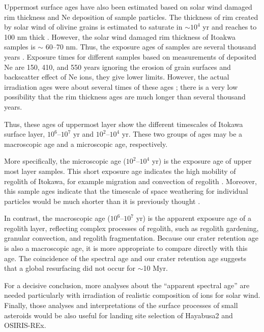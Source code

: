 \documentclass[3p,authoryear]{elsarticle}
\begin{document}
Uppermost surface ages have also been estimated based on solar wind damaged rim thickness and Ne deposition of sample particles. The thickness of rim created by solar wind of olivine grains is estimated to saturate in $\sim 10^4$ yr and reaches to 100 nm thick \citep{keller2016}. However, the solar wind damaged rim thickness of Itoakwa samples is $\sim$ 60--70 nm. Thus, the exposure ages of samples are several thousand years \citep{berger2015}. Exposure times for different samples based on measurements of deposited Ne are 150, 410, and 550 years ignoring the erosion of grain surfaces and backscatter effect of Ne ions, they give lower limits. However, the actual irradiation ages were about several times of these ages \citep{nagao2011}; there is a very low possibility that the rim thickness ages are much longer than several thousand years.

Thus, these ages of uppermost layer show the different timescales of Itokawa surface layer, $10^6$--$10^7$ yr and $10^2$--$10^4$ yr. These two groups of ages may be a macroscopic age and a microscopic age, respectively.

More specifically, the microscopic age ($10^2$--$10^4$ yr) is the exposure age of upper most layer samples. This short exposure age indicates the high mobility of regolith of Itokawa, for example migration and convection of regolith \citep{miyamoto2007}. Moreover, this sample ages indicate that the timescale of space weathering for individual particles would be much shorter than it is previously thought \citep{strazzulla2005}.

In contrast, the macroscopic age ($10^6$--$10^7$ yr) is the apparent exposure age of a regolith layer, reflecting complex processes of regolith, such as regolith gardening, granular convection, and regolith fragmentation. Because our crater retention age is also a macroscopic age, it is more appropriate to compare directly with this age. The coincidence of the spectral age and our crater retention age suggests that a global resurfacing did not occur for $\sim$10 Myr.

For a decisive conclusion, more analyses about the ``apparent spectral age'' are needed particularly with irradiation of realistic composition of ions for solar wind. Finally, those analyses and interpretations of the surface processes of small asteroids would be also useful for landing site selection of Hayabusa2 and OSIRIS-REx.
\end{document}
